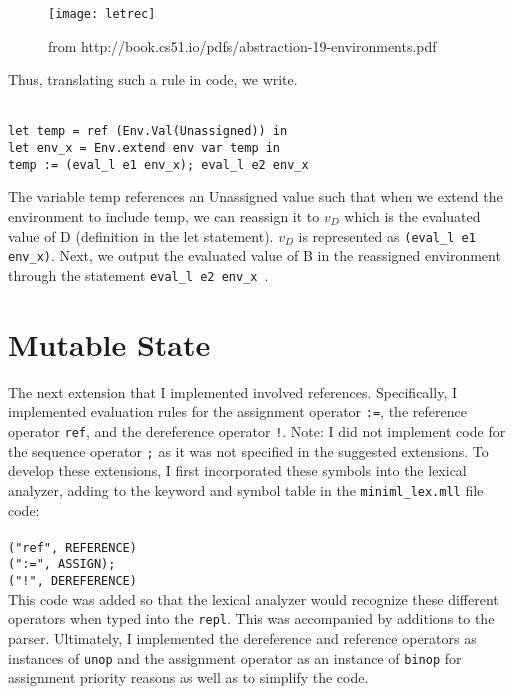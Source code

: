 \documentclass{article}
\def\code#1{\texttt{#1}}
\begin{document}
\begin{figure}
\caption{from http://book.cs51.io/pdfs/abstraction-19-environments.pdf}
\centering
\texttt{[image: letrec]}
\end{figure}

Thus, translating such a rule in code, we write. 

\code{
\\ let temp = ref (Env.Val(Unassigned)) in 
\\ let env\_x = Env.extend env var temp in 
\\ temp := (eval\_l e1 env\_x); eval\_l e2 env\_x }


The variable temp references an Unassigned value such that when we extend the environment to include temp, we can reassign it to $v_{D}$ which is the evaluated value of D (definition in the let statement). $v_{D}$  is represented as \code{(eval\_l e1 env\_x)}. Next, we output the evaluated value of B in the reassigned environment through the statement \code{eval\_l e2 env\_x }.

\section{Mutable State}
The next extension that I implemented involved references. Specifically, I implemented evaluation rules for the assignment operator \code{:=}, the reference operator \code{ref}, and the dereference operator \code{!}. Note: I did not implement code for the sequence operator \code{;} as it was not specified in the suggested extensions. To develop these extensions, I first incorporated these symbols into the lexical analyzer, adding to the keyword and symbol table in the \code{miniml\_lex.mll} file code:
\\
\\ \code{("ref", REFERENCE)} 
\\ \code{(":=", ASSIGN);
\\("!", DEREFERENCE)} 
\\

 This code was added so that the lexical analyzer would recognize these different operators when typed into the \code{repl}. This was accompanied by additions to the parser. Ultimately, I implemented the dereference and reference operators as instances of \code{unop} and the assignment operator as an instance of \code{binop} for assignment priority reasons as well as to simplify the code. 
 
\end{document}
